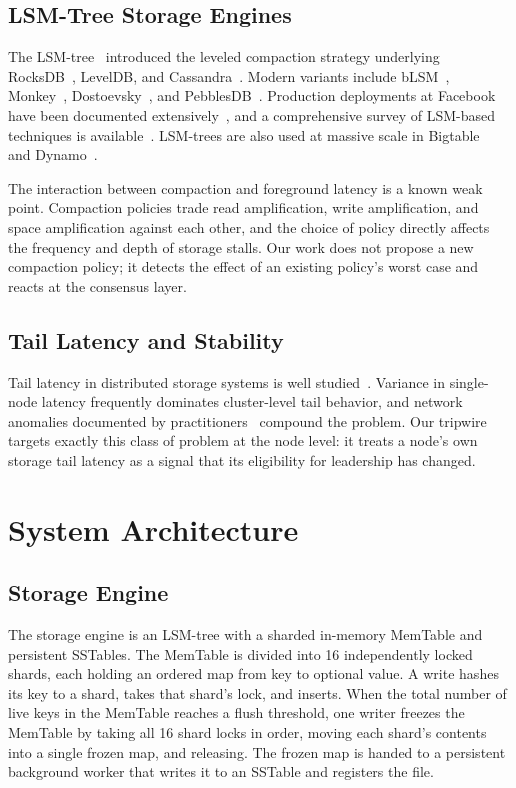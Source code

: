 \documentclass[conference, a4paper]{IEEEtran}
\begin{document}
\subsection{LSM-Tree Storage Engines}

The LSM-tree~\cite{lsm} introduced the leveled compaction strategy
underlying RocksDB~\cite{dong_rocksdb}, LevelDB, and
Cassandra~\cite{lakshman_cassandra}. Modern variants
include bLSM~\cite{sears_blsm}, Monkey~\cite{dayan_monkey},
Dostoevsky~\cite{dayan_dostoevsky}, and
PebblesDB~\cite{raju_pebblesdb}. Production deployments at
Facebook have been documented extensively~\cite{matsunobu_myrocks,
cao_rocksdb_workload}, and a comprehensive survey of LSM-based
techniques is available~\cite{luo_lsm_survey}. LSM-trees are also used
at massive scale in Bigtable~\cite{chang_bigtable} and
Dynamo~\cite{decandia_dynamo}.

The interaction between compaction and foreground latency is a known
weak point. Compaction policies trade read amplification, write
amplification, and space amplification against each other, and the
choice of policy directly affects the frequency and depth of storage
stalls. Our work does not propose a new compaction policy; it detects
the effect of an existing policy's worst case and reacts at the
consensus layer.

\subsection{Tail Latency and Stability}

Tail latency in distributed storage systems is well
studied~\cite{dean_tail,li_tales_tail,hao_tail}. Variance in single-node
latency frequently dominates cluster-level tail behavior, and network
anomalies documented by practitioners~\cite{bailis_network} compound
the problem. Our tripwire targets exactly this class of problem at the
node level: it treats a node's own storage tail latency as a signal that
its eligibility for leadership has changed.

\section{System Architecture}

\subsection{Storage Engine}

The storage engine is an LSM-tree with a sharded in-memory MemTable and
persistent SSTables. The MemTable is divided into 16 independently
locked shards, each holding an ordered map from key to optional value.
A write hashes its key to a shard, takes that shard's lock, and inserts.
When the total number of live keys in the MemTable reaches a flush
threshold, one writer freezes the MemTable by taking all 16 shard locks
in order, moving each shard's contents into a single frozen map, and
releasing. The frozen map is handed to a persistent background worker
that writes it to an SSTable and registers the file.
\end{document}
